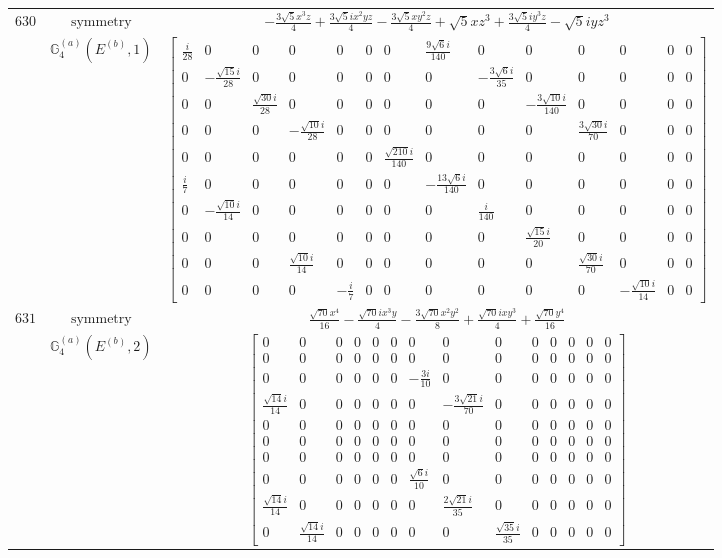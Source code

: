 \documentclass[fleqn,8pt,landscape]{jsarticle}
\begin{document}
\begin{longtable}{ccc}
$ 630 $ & $ \text{symmetry} $ & $ - \frac{3 \sqrt{5} x^{3} z}{4} + \frac{3 \sqrt{5} i x^{2} y z}{4} - \frac{3 \sqrt{5} x y^{2} z}{4} + \sqrt{5} x z^{3} + \frac{3 \sqrt{5} i y^{3} z}{4} - \sqrt{5} i y z^{3} $ \\
$  $ & $ \mathbb{G}_{4}^{(a)}(E^{(b)},1) $ & $ \begin{bmatrix} \frac{i}{28} & 0 & 0 & 0 & 0 & 0 & 0 & \frac{9 \sqrt{6} i}{140} & 0 & 0 & 0 & 0 & 0 & 0 \\ 0 & - \frac{\sqrt{15} i}{28} & 0 & 0 & 0 & 0 & 0 & 0 & - \frac{3 \sqrt{6} i}{35} & 0 & 0 & 0 & 0 & 0 \\ 0 & 0 & \frac{\sqrt{30} i}{28} & 0 & 0 & 0 & 0 & 0 & 0 & - \frac{3 \sqrt{10} i}{140} & 0 & 0 & 0 & 0 \\ 0 & 0 & 0 & - \frac{\sqrt{10} i}{28} & 0 & 0 & 0 & 0 & 0 & 0 & \frac{3 \sqrt{30} i}{70} & 0 & 0 & 0 \\ 0 & 0 & 0 & 0 & 0 & 0 & \frac{\sqrt{210} i}{140} & 0 & 0 & 0 & 0 & 0 & 0 & 0 \\ \frac{i}{7} & 0 & 0 & 0 & 0 & 0 & 0 & - \frac{13 \sqrt{6} i}{140} & 0 & 0 & 0 & 0 & 0 & 0 \\ 0 & - \frac{\sqrt{10} i}{14} & 0 & 0 & 0 & 0 & 0 & 0 & \frac{i}{140} & 0 & 0 & 0 & 0 & 0 \\ 0 & 0 & 0 & 0 & 0 & 0 & 0 & 0 & 0 & \frac{\sqrt{15} i}{20} & 0 & 0 & 0 & 0 \\ 0 & 0 & 0 & \frac{\sqrt{10} i}{14} & 0 & 0 & 0 & 0 & 0 & 0 & \frac{\sqrt{30} i}{70} & 0 & 0 & 0 \\ 0 & 0 & 0 & 0 & - \frac{i}{7} & 0 & 0 & 0 & 0 & 0 & 0 & - \frac{\sqrt{10} i}{14} & 0 & 0 \end{bmatrix} $ \\ \hline
$ 631 $ & $ \text{symmetry} $ & $ \frac{\sqrt{70} x^{4}}{16} - \frac{\sqrt{70} i x^{3} y}{4} - \frac{3 \sqrt{70} x^{2} y^{2}}{8} + \frac{\sqrt{70} i x y^{3}}{4} + \frac{\sqrt{70} y^{4}}{16} $ \\
$  $ & $ \mathbb{G}_{4}^{(a)}(E^{(b)},2) $ & $ \begin{bmatrix} 0 & 0 & 0 & 0 & 0 & 0 & 0 & 0 & 0 & 0 & 0 & 0 & 0 & 0 \\ 0 & 0 & 0 & 0 & 0 & 0 & 0 & 0 & 0 & 0 & 0 & 0 & 0 & 0 \\ 0 & 0 & 0 & 0 & 0 & 0 & - \frac{3 i}{10} & 0 & 0 & 0 & 0 & 0 & 0 & 0 \\ \frac{\sqrt{14} i}{14} & 0 & 0 & 0 & 0 & 0 & 0 & - \frac{3 \sqrt{21} i}{70} & 0 & 0 & 0 & 0 & 0 & 0 \\ 0 & 0 & 0 & 0 & 0 & 0 & 0 & 0 & 0 & 0 & 0 & 0 & 0 & 0 \\ 0 & 0 & 0 & 0 & 0 & 0 & 0 & 0 & 0 & 0 & 0 & 0 & 0 & 0 \\ 0 & 0 & 0 & 0 & 0 & 0 & 0 & 0 & 0 & 0 & 0 & 0 & 0 & 0 \\ 0 & 0 & 0 & 0 & 0 & 0 & \frac{\sqrt{6} i}{10} & 0 & 0 & 0 & 0 & 0 & 0 & 0 \\ \frac{\sqrt{14} i}{14} & 0 & 0 & 0 & 0 & 0 & 0 & \frac{2 \sqrt{21} i}{35} & 0 & 0 & 0 & 0 & 0 & 0 \\ 0 & \frac{\sqrt{14} i}{14} & 0 & 0 & 0 & 0 & 0 & 0 & \frac{\sqrt{35} i}{35} & 0 & 0 & 0 & 0 & 0 \end{bmatrix} $ \\ \hline

\end{longtable}
\end{document}

